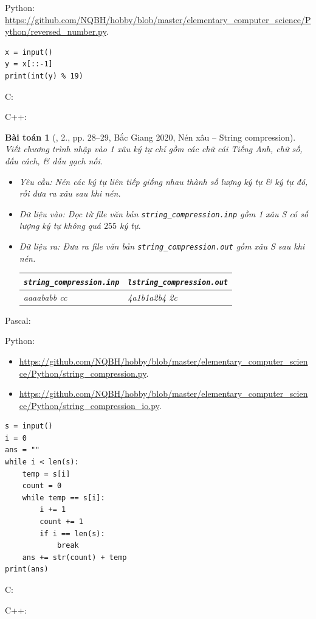 \documentclass{article}
\newtheorem{baitoan}{Bài toán}
\begin{document}
Python: \url{https://github.com/NQBH/hobby/blob/master/elementary_computer_science/Python/reversed_number.py}.
\begin{verbatim}
x = input()
y = x[::-1]
print(int(y) % 19)
\end{verbatim}
C:

C++:

\begin{baitoan}[\cite{VietSTEM2021}, 2., pp. 28--29, Bắc Giang 2020, Nén xâu -- String compression]
	Viết chương trình nhập vào 1 xâu ký tự chỉ gồm các chữ cái Tiếng Anh, chữ số, dấu cách, \& dấu gạch nối.
	\begin{itemize}
		\item {\sf Yêu cầu:} Nén các ký tự liên tiếp giống nhau thành số lượng ký tự \& ký tự đó, rồi đưa ra xâu sau khi nén.
		\item {\sf Dữ liệu vào:} Đọc từ file văn bản \verb|string_compression.inp| gồm 1 xâu S có số lượng ký tự không quá $255$ ký tự.
		\item {\sf Dữ liệu ra:} Đưa ra file văn bản \verb|string_compression.out| gồm xâu S sau khi nén.
		\begin{table}[H]
			\centering
			\begin{tabular}{|l|l|}
				\hline
				\verb|string_compression.inp| & \verb|lstring_compression.out| \\
				\hline
				aaaababb    cc & 4a1b1a2b4 2c \\
				\hline
			\end{tabular}
		\end{table}
	\end{itemize}
\end{baitoan}
\noindent Pascal:

Python:
\begin{itemize}
    \item \url{https://github.com/NQBH/hobby/blob/master/elementary_computer_science/Python/string_compression.py}.
    \item \url{https://github.com/NQBH/hobby/blob/master/elementary_computer_science/Python/string_compression_io.py}.
\end{itemize}
\begin{verbatim}
s = input()
i = 0
ans = ""
while i < len(s):
    temp = s[i]
    count = 0
    while temp == s[i]:
        i += 1
        count += 1
        if i == len(s):
            break
    ans += str(count) + temp
print(ans)
\end{verbatim}
C:

C++:
\end{document}
